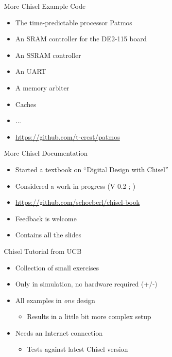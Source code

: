 \documentclass[xcolor=pdflatex,dvipsnames,table]{beamer}
\begin{document}
\begin{frame}[fragile]{More Chisel Example Code}
\begin{itemize}
\item The time-predictable processor Patmos
\item An SRAM controller for the DE2-115 board
\item An SSRAM controller
\item An UART
\item A memory arbiter
\item Caches
\item ...
\item \url{https://github.com/t-crest/patmos}
\end{itemize}
\end{frame}


\begin{frame}[fragile]{More Chisel Documentation}
\begin{itemize}
\item Started a textbook on ``Digital Design with Chisel''
\item Considered a work-in-progress (V 0.2 ;-)
\item \url{https://github.com/schoeberl/chisel-book}
\item Feedback is welcome
\item Contains all the slides
\end{itemize}
\end{frame}

\begin{frame}[fragile]{Chisel Tutorial from UCB}
\begin{itemize}
\item Collection of small exercises
\item Only in simulation, no hardware required (+/-)
\item All examples in \emph{one} design
\begin{itemize}
\item Results in a little bit more complex setup
\end{itemize}
\item Needs an Internet connection
\begin{itemize}
\item  Tests against latest Chisel version
\end{itemize}
\end{itemize}
\end{frame}
\end{document}
